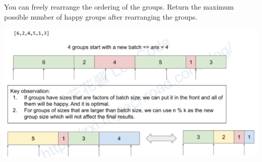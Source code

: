\documentclass[9pt, b5paaper]{book}
\begin{document}
You can freely rearrange the ordering of the groups. Return the maximum possible number of happy groups after rearranging the groups.

\includegraphics[width=.9\linewidth]{./pic/donut.png}
\end{document}
